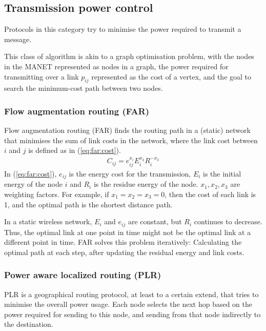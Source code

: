 \subsection{Transmission power control}
\label{power-control}
Protocols in this category try to minimise the power required to transmit
a message.

This class of algorithm is akin to a graph optimisation problem,
with the nodes in the MANET represented as nodes in a graph, the power required for
transmitting over a link $p_{ij}$ represented as the cost of a vertex, and the goal
to search the minimum-cost path between two nodes.

\subsubsection{Flow augmentation routing (FAR)}
Flow augmentation routing (FAR)\cite{chang2000energy} finds the routing
path in a (static) network that minimises the sum of link costs in the network,
where the link cost between $i$ and $j$ is defined as in (\ref{eq:far:cost}).
\begin{align}\label{eq:far:cost}
  C_{ij} = e_{ij}^{x_{i}}E_{i}^{x_{2}}R_{i}^{-x_{3}}
\end{align}
In (\ref{eq:far:cost}), \(e_{ij}\) is the energy cost for the transmission, $E_{i}$ is the initial energy
of the node $i$ and $R_{i}$ is the residue energy of the node. \(x_{1}, x_{2}, x_{3}\)
are weighting factors. For example, if $x_{1}=x_{2}=x_{3}=0$, then the cost
of each link is 1, and the optimal path is the shortest distance path.

In a static wireless network, $E_{i}$ and $e_{ij}$ are constant, but $R_{i}$
continues to decrease. Thus, the optimal link at one point in time might not be the
optimal link at a different point in time. FAR solves this problem iteratively:
Calculating the optimal path at each step, after updating the residual energy
and link costs.


\subsubsection{Power aware localized routing (PLR)}
PLR\cite{stojmenovic2001power} is a geographical routing protocol, at least
to a certain extend, that tries to minimise the overall power usage. Each node
selects the next hop based on the power required for sending to this node, and
sending from that node indirectly to the destination.

